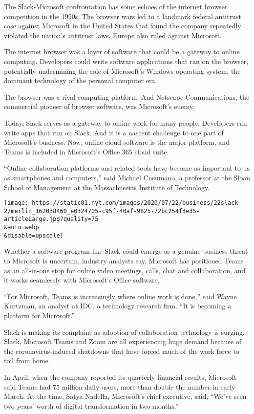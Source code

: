 The Slack-Microsoft confrontation has some echoes of the internet
browser competition in the 1990s. The browser wars led to a landmark
federal antitrust case against Microsoft in the United States that found
the company repeatedly violated the nation's antitrust laws. Europe also
ruled against Microsoft.

The internet browser was a layer of software that could be a gateway to
online computing. Developers could write software applications that ran
on the browser, potentially undermining the role of Microsoft's Windows
operating system, the dominant technology of the personal computer era.

The browser was a rival computing platform. And Netscape Communications,
the commercial pioneer of browser software, was Microsoft's enemy.

Today, Slack serves as a gateway to online work for many people.
Developers can write apps that run on Slack. And it is a nascent
challenge to one part of Microsoft's business. Now, online cloud
software is the major platform, and Teams is included in Microsoft's
Office 365 cloud suite.

``Online collaboration platforms and related tools have become as
important to us as smartphones and computers,'' said Michael Cusumano, a
professor at the Sloan School of Management at the Massachusetts
Institute of Technology.

\texttt{[image: https://static01.nyt.com/images/2020/07/22/business/22slack-2/merlin\_162038460\_e0324705-c95f-40af-9825-72bc254f3e35-articleLarge.jpg?quality=75\\\&auto=webp\\\&disable=upscale]}

Whether a software program like Slack could emerge as a genuine business
threat to Microsoft is uncertain, industry analysts say. Microsoft has
positioned Teams as an all-in-one stop for online video meetings, calls,
chat and collaboration, and it works seamlessly with Microsoft's Office
software.

``For Microsoft, Teams is increasingly where online work is done,'' said
Wayne Kurtzman, an analyst at IDC, a technology research firm. ``It is
becoming a platform for Microsoft.''

Slack is making its complaint as adoption of collaboration technology is
surging. Slack, Microsoft Teams and Zoom are all experiencing huge
demand because of the coronavirus-induced shutdowns that have forced
much of the work force to toil from home.

In April, when the company reported its quarterly financial results,
Microsoft said Teams had 75 million daily users, more than double the
number in early March. At the time, Satya Nadella, Microsoft's chief
executive, said, ``We've seen two years' worth of digital transformation
in two months.''

